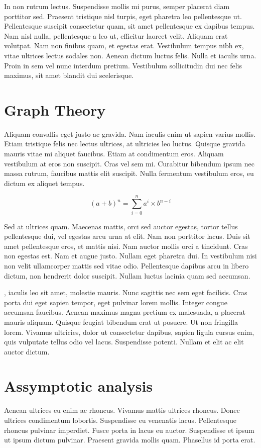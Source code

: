 \documentclass[a4paper, 12pt]{article}
\newcommand{\bast}{(a + b)^n = \sum_{i=0}^{n} a^i \times b^{n - i}}
\begin{document}
	In non rutrum lectus. Suspendisse mollis mi purus, semper placerat diam porttitor sed. Praesent tristique nisl turpis, eget pharetra leo pellentesque ut. Pellentesque suscipit consectetur quam, sit amet pellentesque ex dapibus tempus. Nam nisl nulla, pellentesque a leo ut, efficitur laoreet velit. Aliquam erat volutpat. Nam non finibus quam, et egestas erat. Vestibulum tempus nibh ex, vitae ultrices lectus sodales non. Aenean dictum luctus felis. Nulla et iaculis urna. Proin in sem vel nunc interdum pretium. Vestibulum sollicitudin dui nec felis maximus, sit amet blandit dui scelerisque.
	
	\section{Graph Theory}
	Aliquam convallis eget justo ac gravida. Nam iaculis enim ut sapien varius mollis. Etiam tristique felis nec lectus ultrices, at ultricies leo luctus. Quisque gravida mauris vitae mi aliquet faucibus. Etiam at condimentum eros. Aliquam vestibulum at eros non suscipit. Cras vel sem mi. Curabitur bibendum ipsum nec massa rutrum, faucibus mattis elit suscipit. Nulla fermentum vestibulum eros, eu dictum ex aliquet tempus.
	
	$$ \bast $$
	
	Sed at ultrices quam. Maecenas mattis, orci sed auctor egestas, tortor tellus pellentesque dui, vel egestas arcu urna at elit. Nam non porttitor lacus. Duis sit amet pellentesque eros, et mattis nisi. Nam auctor mollis orci a tincidunt. Cras non egestas est. Nam et augue justo. Nullam eget pharetra dui. In vestibulum nisi non velit ullamcorper mattis sed vitae odio. Pellentesque dapibus arcu in libero dictum, non hendrerit dolor suscipit. Nullam luctus lacinia quam sed accumsan.
	
	, iaculis leo sit amet, molestie mauris. Nunc sagittis nec sem eget facilisis. Cras porta dui eget sapien tempor, eget pulvinar lorem mollis. Integer congue accumsan faucibus. Aenean maximus magna pretium ex malesuada, a placerat mauris aliquam. Quisque feugiat bibendum erat ut posuere. Ut non fringilla lorem. Vivamus ultricies, dolor ut consectetur dapibus, sapien ligula cursus enim, quis vulputate tellus odio vel lacus. Suspendisse potenti. Nullam et elit ac elit auctor dictum.
	
	\section[Algorithm Analysis]{Assymptotic analysis}
	Aenean ultrices eu enim ac rhoncus. Vivamus mattis ultrices rhoncus. Donec ultrices condimentum lobortis. Suspendisse eu venenatis lacus. Pellentesque rhoncus pulvinar imperdiet. Fusce porta in lacus eu auctor. Suspendisse et ipsum ut ipsum dictum pulvinar. Praesent gravida mollis quam. Phasellus id porta erat.
	
\end{document}
